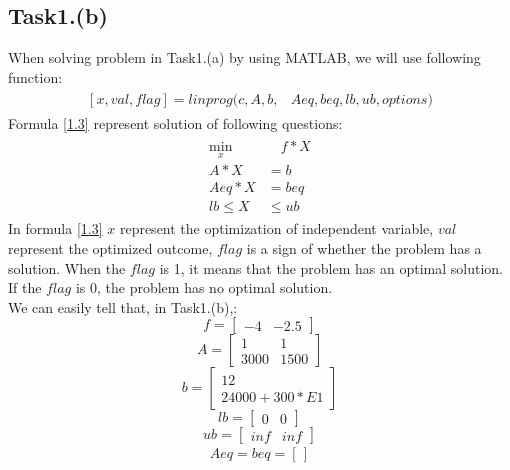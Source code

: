 \documentclass{article}
\begin{document}
    \subsection{Task1.(b)}
        When solving problem in Task1.(a) by using MATLAB, we will use following function:
        \begin{align}\label{1.3}
        \begin{split}  
            [x,val,flag] = linprog(c,A,b,&Aeq,beq,lb,ub,options)
        \end{split}    
        \end{align}    
        Formula \eqref{1.3} represent solution of following questions:
        \begin{align}\label{1.4}
        \begin{split}  
            \min_x &\quad f*X\\
            A*X &= b\\
            Aeq*X &= beq\\
            lb\leq X &\leq ub
        \end{split}    
        \end{align} 
        In formula \eqref{1.3} $x$ represent the optimization of independent variable, $val$ represent the optimized outcome, $flag$ is a sign of whether the problem has a solution. When the $flag$ is 1, it means that the problem has an optimal solution. If the $flag$ is 0, the problem has no optimal solution.\\
        We can easily tell that, in Task1.(b),:
        \[ f = \begin{bmatrix}\label{1.5}
        -4&-2.5
        \end{bmatrix}\]
        \[ A = \begin{bmatrix}\label{1.6}
        1&1\\
        3000&1500
        \end{bmatrix}\]
        \[ b = \begin{bmatrix}\label{1.7}
        12\\
        24000+300*E1
        \end{bmatrix}\]
        \[ lb = \begin{bmatrix}\label{1.8}
        0&0
        \end{bmatrix}\]
        \[ ub = \begin{bmatrix}\label{1.9}
        inf&inf
        \end{bmatrix}\]
        \begin{align}\label{1.10}
            Aeq = beq = [\,]
        \end{align} 
\end{document}
